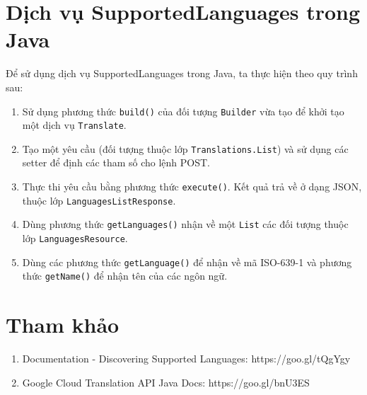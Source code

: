 \documentclass[../thesis.tex]{subfiles}
\begin{document}
\section{Dịch vụ SupportedLanguages trong Java}
Để sử dụng dịch vụ SupportedLanguages trong Java, ta thực hiện theo quy trình sau:
\begin{enumerate}
  \item Sử dụng phương thức \lstinline{build()} của đối tượng \lstinline{Builder} vừa tạo để khởi tạo một dịch vụ \lstinline{Translate}.
  \item Tạo một yêu cầu (đối tượng thuộc lớp \lstinline{Translations.List}) và sử dụng các setter để định các tham số cho lệnh POST.
  \item Thực thi yêu cầu bằng phương thức \lstinline{execute()}. Kết quả trả về ở dạng JSON, thuộc lớp \lstinline{LanguagesListResponse}.
  \item Dùng phương thức \lstinline{getLanguages()} nhận về một \lstinline{List} các đối tượng thuộc lớp \lstinline{LanguagesResource}.
  \item Dùng các phương thức \lstinline{getLanguage()} để nhận về mã ISO-639-1 và phương thức \lstinline{getName()} để nhận tên của các ngôn ngữ.
\end{enumerate}

\section*{Tham khảo}

\begin{enumerate}
  \item Documentation - Discovering Supported Languages: https://goo.gl/tQgYgy
  \item Google Cloud Translation API Java Docs: https://goo.gl/bnU3ES
\end{enumerate}
\end{document}
